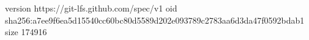 version https://git-lfs.github.com/spec/v1
oid sha256:a7ee9f6ea5d15540cc60bc80d5589d202e093789c2783aa6d3da47f0592bdab1
size 174916
